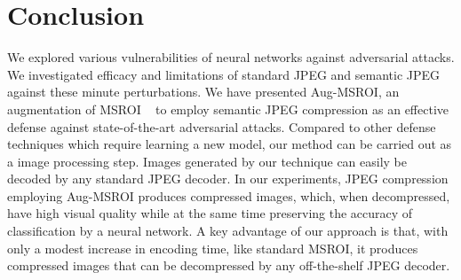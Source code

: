 \section{Conclusion}


We explored various vulnerabilities of neural networks against adversarial attacks. We investigated efficacy and limitations of standard JPEG and semantic JPEG against these minute perturbations. 
We have presented Aug-MSROI, an augmentation of MSROI ~\cite{Prakash2017SemanticPI}  to employ semantic JPEG compression as an effective defense against state-of-the-art adversarial attacks.
Compared to other defense techniques which require learning a new model, our method can be carried out as a image processing step. Images generated by our technique can easily be decoded by any standard JPEG decoder. 
In our experiments, JPEG compression employing Aug-MSROI produces compressed images, which, when decompressed, have high visual quality while at the same time preserving the accuracy of classification by a neural network. 
A key advantage of our approach is that, with only a modest increase in encoding time, like standard MSROI, it produces compressed images that can be decompressed by any off-the-shelf JPEG decoder.
